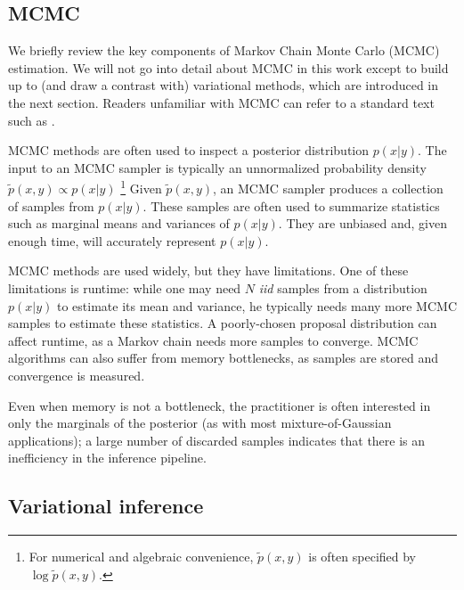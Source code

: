 \subsection{MCMC}


We briefly review the key components of Markov Chain Monte Carlo
(MCMC) estimation.  We will not go into detail about MCMC in this work
except to build up to (and draw a contrast with) variational methods,
which are introduced in the next section. Readers unfamiliar with MCMC
can refer to a standard text such as \cite{bishop:2006}.


MCMC methods are often used to inspect a posterior distribution $p(x |
y)$.  The input to an MCMC sampler is typically an unnormalized
probability density $\tilde p(x, y) \propto p(x | y)$ \footnote{For
  numerical and algebraic convenience, $\tilde p(x, y)$ is often
  specified by $\log \tilde p(x, y)$.}  Given $\tilde p(x, y)$, an
MCMC sampler produces a collection of samples from $p(x | y)$.  These
samples are often used to summarize statistics such as marginal means
and variances of $p(x | y)$.  They are unbiased and, given enough
time, will accurately represent $p(x | y)$.

MCMC methods are used widely, but they have limitations.
One of these limitations is runtime: while one may need $N$ \emph{iid}
samples from a distribution $p(x | y)$ to estimate its mean and
variance, he typically needs many more MCMC samples to estimate these
statistics.  A poorly-chosen proposal distribution can affect runtime,
as a Markov chain needs more samples to converge. MCMC algorithms can
also suffer from memory bottlenecks, as samples are stored and
convergence is measured.

Even when memory is not a bottleneck, the practitioner is often
interested in only the marginals of the posterior (as with most
mixture-of-Gaussian applications); a large number of discarded samples
indicates that there is an inefficiency in the inference pipeline.

\subsection{Variational inference}
\label{sec:variational_inference}

